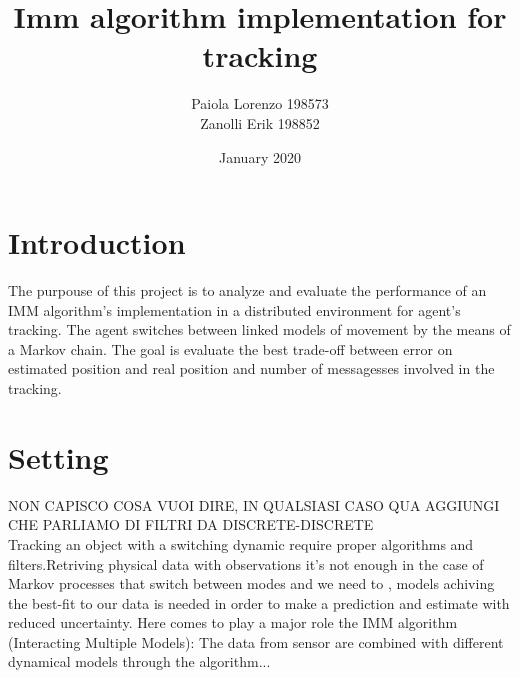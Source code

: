 \documentclass[twocolumn]{article}
\title{Imm algorithm implementation for tracking}
\author{
Paiola Lorenzo 198573 

Zanolli Erik 198852}
\date{January 2020}
\begin{document}
\maketitle



\section*{Introduction}
\justify
The purpouse of this project is to analyze and evaluate the performance of an IMM algorithm's implementation in a distributed environment for
agent's tracking. The agent switches between linked models of movement by the means of a Markov chain. The goal is evaluate the best trade-off
between error on estimated position and real position and number of messagesses involved in the tracking.


    \section*{Setting}
    \justify
    NON CAPISCO COSA VUOI DIRE, IN QUALSIASI CASO QUA AGGIUNGI CHE PARLIAMO DI FILTRI DA DISCRETE-DISCRETE
    \\
    Tracking an object with a switching dynamic require proper algorithms and filters.Retriving physical data with
    observations it's not enough in the case of Markov processes that switch between modes and we need to
    , models achiving the best-fit to our data is needed in order to make a prediction and estimate
    with reduced uncertainty. Here comes to play a major role the IMM algorithm (Interacting Multiple Models): The data
    from sensor are combined with different dynamical models through the algorithm...
\end{document}
